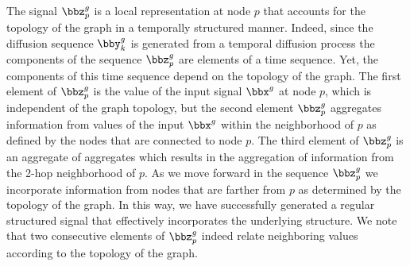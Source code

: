 %
The signal $\bbz_p^g$ is a local representation at node $p$ that accounts for the topology of the graph in a temporally structured manner. Indeed, since the diffusion sequence $\bby^g_k$ is generated from a temporal diffusion process the components of the sequence $\bbz_p^g$ are elements of a time sequence. Yet, the components of this time sequence depend on the topology of the graph. The first element of $\bbz_p^g$ is the value of the input signal $\bbx^g$ at node $p$, which is independent of the graph topology, but the second element $\bbz_p^g$ aggregates information from values of the input $\bbx^g$ within the neighborhood of $p$ as defined by the nodes that are connected to node $p$. The third element of $\bbz_p^g$ is an aggregate of aggregates which results in the aggregation of information from the 2-hop neighborhood of $p$. As we move forward in the sequence $\bbz_p^g$ we incorporate information from nodes that are farther from $p$ as determined by the topology of the graph. In this way, we have successfully generated a regular structured signal that effectively incorporates the underlying structure. We note that two consecutive elements of $\bbz_{p}^{g}$ indeed relate neighboring values according to the topology of the graph.

